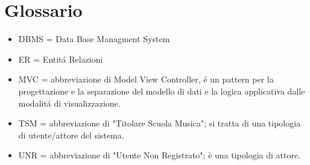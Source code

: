 \chapter{ Glossario }


\begin{itemize}

\item DBMS = Data Base Managment System

\item ER = Entit\'a Relazioni
\item MVC = abbreviazione di Model View Controller, \'e un pattern per la progettazione e la separazione del modello di dati e la logica applicativa dalle modalit\'a di visualizzazione. 

\item TSM = abbreviazione di "Titolare Scuola Musica"; si tratta di una tipologia di utente/attore del sistema.

\item UNR = abbreviazione di "Utente Non Registrato"; è una tipologia di attore.





\end{itemize}
